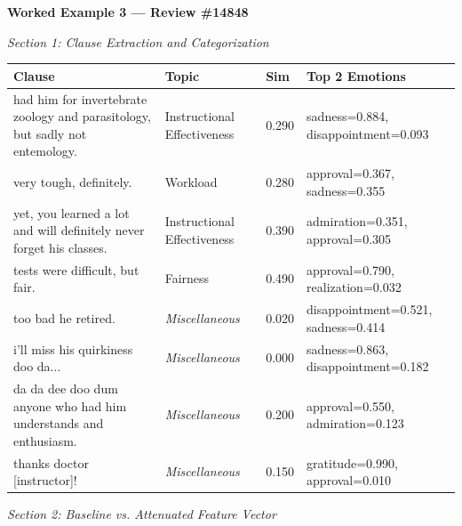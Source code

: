 \documentclass{article}
\begin{document}
\thispagestyle{empty}

\noindent\textbf{Worked Example 3 — Review \#14848}

\vspace{0.5em}
\noindent\textit{Section 1: Clause Extraction and Categorization}

\vspace{0.3em}
\noindent
\begin{tabular}{p{7cm} p{3.5cm} p{1cm} p{5.5cm}}
\toprule
\textbf{Clause} & \textbf{Topic} & \textbf{Sim} & \textbf{Top 2 Emotions} \\
\midrule
had him for invertebrate zoology and parasitology, but sadly not entemology. & Instructional Effectiveness & 0.290 & sadness=0.884, disappointment=0.093 \\
\addlinespace
very tough, definitely. & Workload & 0.280 & approval=0.367, sadness=0.355 \\
\addlinespace
yet, you learned a lot and will definitely never forget his classes. & Instructional Effectiveness & 0.390 & admiration=0.351, approval=0.305 \\
\addlinespace
tests were difficult, but fair. & Fairness & 0.490 & approval=0.790, realization=0.032 \\
\addlinespace
too bad he retired. & \textit{Miscellaneous} & 0.020 & disappointment=0.521, sadness=0.414 \\
\addlinespace
 i'll miss his quirkiness doo da... & \textit{Miscellaneous} & 0.000 & sadness=0.863, disappointment=0.182 \\
\addlinespace
da da dee doo dum anyone who had him understands and enthusiasm. & \textit{Miscellaneous} & 0.200 & approval=0.550, admiration=0.123 \\
\addlinespace
thanks doctor [instructor]! & \textit{Miscellaneous} & 0.150 & gratitude=0.990, approval=0.010 \\
\bottomrule
\end{tabular}

\vspace{0.8em}
\noindent\textit{Section 2: Baseline vs. Attenuated Feature Vector}
\end{document}
